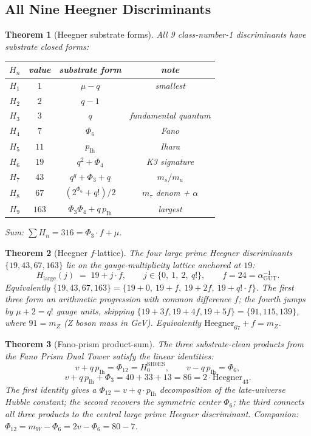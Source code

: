\documentclass[11pt]{article}
\newtheorem{theorem}{Theorem}[section]
\begin{document}
\subsection{All Nine Heegner Discriminants}

\begin{theorem}[Heegner substrate forms]\label{thm:heegners}
All 9 class-number-1 discriminants have substrate closed forms:
\begin{center}\small\begin{tabular}{cccc}
\toprule
$H_n$ & value & substrate form & note \\
\midrule
$H_1$ & $1$    & $\mu - q$         & smallest \\
$H_2$ & $2$    & $q - 1$           & \\
$H_3$ & $3$    & $q$               & fundamental quantum \\
$H_4$ & $7$    & $\Phi_6$           & Fano \\
$H_5$ & $11$   & $p_{\mathrm{Ih}}$ & Ihara \\
$H_6$ & $19$   & $q^2 + \Phi_4$    & K3 signature \\
$H_7$ & $43$   & $q^q + \Phi_3 + q$ & $m_s/m_u$ \\
$H_8$ & $67$   & $(2^{\Phi_6} + q!)/2$ & $m_\tau$ denom + $\alpha$ \\
$H_9$ & $163$  & $\Phi_3 \Phi_4 + q\,p_{\mathrm{Ih}}$ & largest \\
\bottomrule
\end{tabular}\end{center}
Sum: $\sum H_n = 316 = \Phi_3 \cdot f + \mu$.
\end{theorem}

\begin{theorem}[Heegner $f$-lattice]\label{thm:heegner_f_lattice}
The four \emph{large prime} Heegner discriminants $\{19,43,67,163\}$
lie on the gauge-multiplicity lattice anchored at $19$:
\[
  H_{\text{large}}(j) \;=\; 19 + j \cdot f, \qquad
  j \in \{0,\ 1,\ 2,\ q!\}, \qquad f = 24 = \alpha^{-1}_{\mathrm{GUT}}.
\]
Equivalently $\{19,43,67,163\} = \{19+0,\ 19+f,\ 19+2f,\ 19+q!\cdot f\}$.
The first three form an arithmetic progression with common difference
$f$; the fourth jumps by $\mu+2 = q!$ gauge units, skipping
$\{19+3f,19+4f,19+5f\} = \{91,115,139\}$, where $91 = m_Z$
(Z boson mass in GeV).  Equivalently $\mathrm{Heegner}_{67} + f = m_Z$.
\end{theorem}

\begin{theorem}[Fano-prism product-sum]\label{thm:fano_prism_product_sum}
The three substrate-clean products from the Fano Prism Dual Tower
satisfy the linear identities:
\[
  v + q\,p_{\mathrm{Ih}} = \Phi_{12} = H_0^{\mathrm{SH0ES}}, \qquad
  v - q\,p_{\mathrm{Ih}} = \Phi_6,
\]
\[
  v + q\,p_{\mathrm{Ih}} + \Phi_3 = 40 + 33 + 13 = 86 = 2 \cdot \mathrm{Heegner}_{43}.
\]
The first identity gives a $\Phi_{12} = v + q\cdot p_{\mathrm{Ih}}$
decomposition of the late-universe Hubble constant; the second
recovers the symmetric center $\Phi_6$; the third connects all three
products to the central large prime Heegner discriminant.
Companion: $\Phi_{12} = m_W - \Phi_6 = 2v - \Phi_6 = 80-7$.
\end{theorem}
\end{document}
